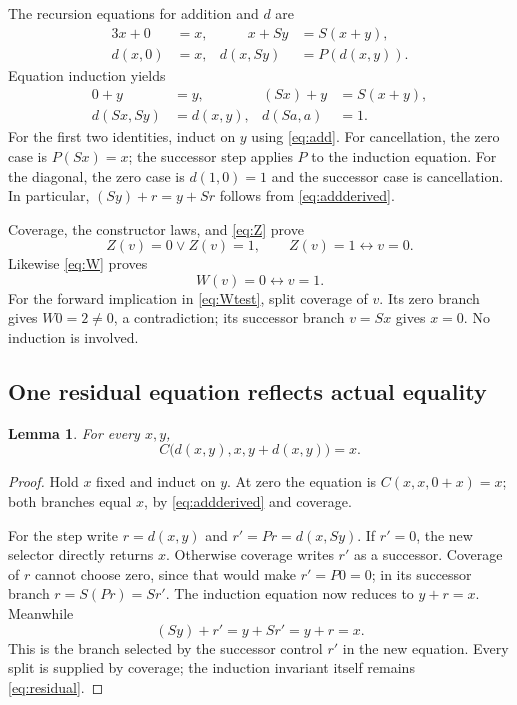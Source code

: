 \documentclass[11pt,letterpaper]{article}
\newtheorem{lemma}[theorem]{Lemma}
\theoremstyle{definition}\newtheorem{definition}[theorem]{Definition}
\theoremstyle{remark}\newtheorem{remark}[theorem]{Remark}
\begin{document}
The recursion equations for addition and $d$ are
\begin{alignat}{3}
 x+0&=x,&\qquad x+Sy&=S(x+y),\label{eq:add}\\
 d(x,0)&=x,& d(x,Sy)&=P(d(x,y)).\label{eq:monus}
\end{alignat}
Equation induction yields
\begin{align}
 0+y&=y,& (Sx)+y&=S(x+y),\label{eq:addderived}\\
 d(Sx,Sy)&=d(x,y),&d(Sa,a)&=1.\label{eq:dderived}
\end{align}
For the first two identities, induct on $y$ using \eqref{eq:add}.
For cancellation, the zero case is $P(Sx)=x$; the successor step
applies $P$ to the induction equation. For the diagonal, the zero
case is $d(1,0)=1$ and the successor case is cancellation.
In particular, $(Sy)+r=y+Sr$ follows from \eqref{eq:addderived}.

Coverage, the constructor laws, and \eqref{eq:Z} prove
\[
 Z(v)=0\lor Z(v)=1,\qquad Z(v)=1\leftrightarrow v=0.
\]
Likewise \eqref{eq:W} proves
\begin{equation}
 W(v)=0\leftrightarrow v=1.\label{eq:Wtest}
\end{equation}
For the forward implication in \eqref{eq:Wtest}, split coverage of
$v$. Its zero branch gives $W0=2\ne0$, a contradiction; its
successor branch $v=Sx$ gives $x=0$. No induction is involved.

\subsection{One residual equation reflects actual equality}

\begin{lemma}\label{lem:residual}
For every $x,y$,
\begin{equation}
 C\bigl(d(x,y),x,y+d(x,y)\bigr)=x.\label{eq:residual}
\end{equation}
\end{lemma}
\begin{proof}
Hold $x$ fixed and induct on $y$. At zero the equation is
$C(x,x,0+x)=x$; both branches equal $x$, by \eqref{eq:addderived}
and coverage.

For the step write $r=d(x,y)$ and $r'=Pr=d(x,Sy)$.
If $r'=0$, the new selector directly returns $x$.
Otherwise coverage writes $r'$ as a successor. Coverage of $r$
cannot choose zero, since that would make $r'=P0=0$; in its
successor branch $r=S(Pr)=Sr'$. The induction equation now
reduces to $y+r=x$. Meanwhile
\[
 (Sy)+r'=y+Sr'=y+r=x.
\]
This is the branch selected by the successor control $r'$ in
the new equation. Every split is supplied by coverage; the
induction invariant itself remains \eqref{eq:residual}.
\end{proof}
\end{document}
